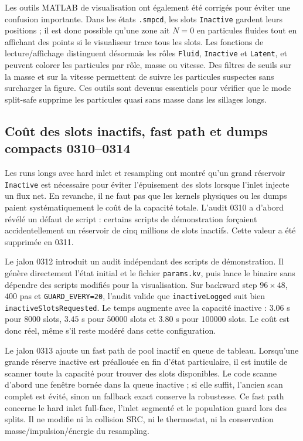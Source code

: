 \documentclass[11pt,a4paper]{article}
\begin{document}
Les outils MATLAB de visualisation ont également été corrigés pour éviter une confusion importante. Dans les états \texttt{.smpcd}, les slots \texttt{Inactive} gardent leurs positions ; il est donc possible qu'une zone ait $N=0$ en particules fluides tout en affichant des points si le visualiseur trace tous les slots. Les fonctions de lecture/affichage distinguent désormais les rôles \texttt{Fluid}, \texttt{Inactive} et \texttt{Latent}, et peuvent colorer les particules par rôle, masse ou vitesse. Des filtres de seuils sur la masse et sur la vitesse permettent de suivre les particules suspectes sans surcharger la figure. Ces outils sont devenus essentiels pour vérifier que le mode split-safe supprime les particules quasi sans masse dans les sillages longs.

\subsection{Coût des slots inactifs, fast path et dumps compacts 0310--0314}

Les runs longs avec hard inlet et resampling ont montré qu'un grand réservoir \texttt{Inactive} est nécessaire pour éviter l'épuisement des slots lorsque l'inlet injecte un flux net. En revanche, il ne faut pas que les kernels physiques ou les dumps paient systématiquement le coût de la capacité totale. L'audit 0310 a d'abord révélé un défaut de script : certains scripts de démonstration forçaient accidentellement un réservoir de cinq millions de slots inactifs. Cette valeur a été supprimée en 0311.

Le jalon 0312 introduit un audit indépendant des scripts de démonstration. Il génère directement l'état initial et le fichier \texttt{params.kv}, puis lance le binaire sans dépendre des scripts modifiés pour la visualisation. Sur backward step $96\times48$, $400$ pas et \texttt{GUARD\_EVERY=20}, l'audit valide que \texttt{inactiveLogged} suit bien \texttt{inactiveSlotsRequested}. Le temps augmente avec la capacité inactive : $3.06$ s pour $8000$ slots, $3.45$ s pour $50000$ slots et $3.80$ s pour $100000$ slots. Le coût est donc réel, même s'il reste modéré dans cette configuration.

Le jalon 0313 ajoute un fast path de pool inactif en queue de tableau. Lorsqu'une grande réserve inactive est préallouée en fin d'état particulaire, il est inutile de scanner toute la capacité pour trouver des slots disponibles. Le code scanne d'abord une fenêtre bornée dans la queue inactive ; si elle suffit, l'ancien scan complet est évité, sinon un fallback exact conserve la robustesse. Ce fast path concerne le hard inlet full-face, l'inlet segmenté et le population guard lors des splits. Il ne modifie ni la collision SRC, ni le thermostat, ni la conservation masse/impulsion/énergie du resampling.
\end{document}
